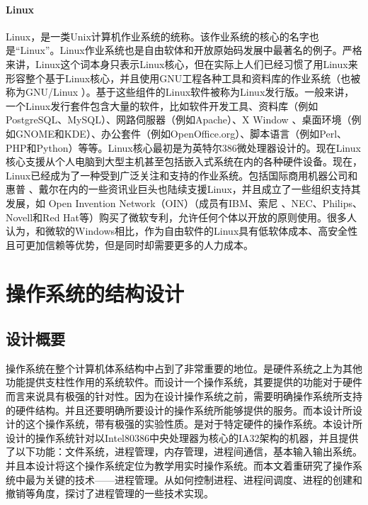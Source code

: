 \documentclass[UTF8,nofonts,cs4size]{ctexrep}
\begin{document}
\subsubsection{Linux}
Linux，是一类Unix计算机作业系统的统称。该作业系统的核心的名字也是“Linux”。Linux作业系统也是自由软体和开放原始码发展中最著名的例子。严格来讲，Linux这个词本身只表示Linux核心，但在实际上人们已经习惯了用Linux来形容整个基于Linux核心，并且使用GNU工程各种工具和资料库的作业系统（也被称为GNU/Linux ）。基于这些组件的Linux软件被称为Linux发行版。一般来讲，一个Linux发行套件包含大量的软件，比如软件开发工具、资料库（例如 PostgreSQL、MySQL）、网路伺服器（例如Apache）、X Window 、桌面环境（例如GNOME和KDE）、办公套件（例如OpenOffice.org）、脚本语言（例如Perl、PHP和Python）等等。Linux核心最初是为英特尔386微处理器设计的。现在Linux核心支援从个人电脑到大型主机甚至包括嵌入式系统在内的各种硬件设备。现在，Linux已经成为了一种受到广泛关注和支持的作业系统。包括国际商用机器公司和惠普 、戴尔在内的一些资讯业巨头也陆续支援Linux，并且成立了一些组织支持其发展，如 Open Invention Network（OIN）（成员有IBM、索尼 、NEC、Philips、Novell和Red Hat等）购买了微软专利，允许任何个体以开放的原则使用。很多人认为，和微软的Windows相比，作为自由软件的Linux具有低软体成本、高安全性且可更加信赖等优势，但是同时却需要更多的人力成本。

\chapter{操作系统的结构设计}
\section{设计概要}
操作系统在整个计算机体系结构中占到了非常重要的地位。是硬件系统之上为其他功能提供支柱性作用的系统软件。而设计一个操作系统，其要提供的功能对于硬件而言来说具有极强的针对性。因为在设计操作系统之前，需要明确操作系统所支持的硬件结构。并且还要明确所要设计的操作系统所能够提供的服务。而本设计所设计的这个操作系统，带有极强的实验性质。是对于特定硬件的操作系统。本设计所设计的操作系统针对以Intel80386中央处理器为核心的IA32架构的机器，并且提供了以下功能：文件系统，进程管理，内存管理，进程间通信，基本输入输出系统。并且本设计将这个操作系统定位为教学用实时操作系统。而本文着重研究了操作系统中最为关键的技术——进程管理。从如何控制进程、进程间调度、进程的创建和撤销等角度，探讨了进程管理的一些技术实现。
\end{document}
